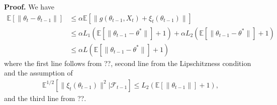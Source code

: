 \documentclass[a4paper]{article}
\newcommand{\norm}[1]{\|#1 \|}
\newcommand{\Exs}{\mathbb{E}}
\newcommand{\thetastar}{\theta^*}
\newcommand{\stepsize}{\alpha}
\begin{document}
	\textbf{Proof.} We have
	\begin{align*}
		\Exs\left[\norm{\theta_{t} - \theta_{t - 1}}\right] &\leq \stepsize\Exs\left[\norm{g\left(\theta_{t - 1}, X_{t}\right) + \xi_{t}\left(\theta_{t - 1}\right)}\right]\\
		& \leq \stepsize L_{1}\left(\Exs\left[\norm{\theta_{t - 1} - \thetastar}\right] + 1\right) + \stepsize L_{2}\left(\Exs\left[\norm{\theta_{t - 1} - \thetastar}\right] + 1\right)\\
		& \leq \stepsize L\left(\Exs\left[\norm{\theta_{t - 1} - \thetastar}\right] + 1\right)
	\end{align*}
	where the first line follows from ??, second line from the Lipschitzness condition and the assumption of
	\begin{align*}
		\Exs^{1 / 2 }\left[\norm{\xi_{t}\left(\theta_{t - 1}\right)}^{2} | \mathcal{F}_{t - 1}\right] \leq L_{2}\left(\Exs\left[\norm{\theta_{t - 1}}\right] + 1\right),
	\end{align*}
	 and the third line from ??.\\
		
\end{document}
